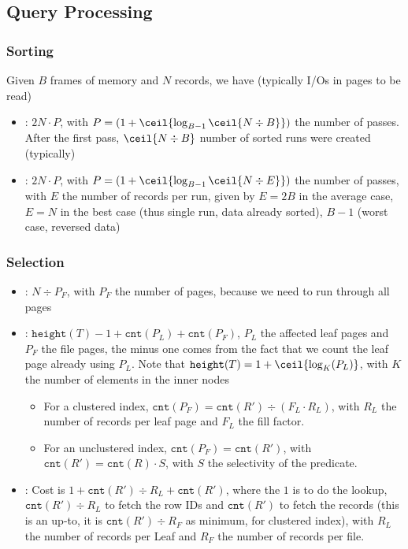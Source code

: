 \newpage
\subsection{Query Processing}
\subsubsection{Sorting}
Given $B$ frames of memory and $N$ records, we have (typically I/Os in pages to be read)
\begin{itemize}
    \item {}: $2N \cdot P$, with $P = (1 + \ceil{\log_{B - 1}\ceil{N \div B}})$ the number of passes.
          After the first pass, $\ceil{N \div B}$ number of sorted runs were created (typically)
    \item {}: $2N \cdot P$, with $P = (1 + \ceil{\log_{B - 1} \ceil{N \div E}})$ the number of passes, with $E$ the number of records per run,
          given by $E = 2B$ in the average case, $E = N$ in the best case (thus single run, data already sorted), $B - 1$ (worst case, reversed data)
\end{itemize}


\subsubsection{Selection}
\begin{itemize}
    \item {}: $N \div P_F$, with $P_F$ the number of pages, because we need to run through all pages
    \item {}: $\texttt{height}(T) - 1 + \texttt{cnt}(P_L) + \texttt{cnt}(P_F)$, $P_L$ the affected leaf pages and $P_F$ the file pages,
          the minus one comes from the fact that we count the leaf page already using $P_L$.
          Note that $\texttt{height}(T) = 1 + \ceil{\log_K(P_L)}$, with $K$ the number of elements in the inner nodes
          \begin{itemize}
              \item For a clustered index, $\texttt{cnt}(P_F) = \texttt{cnt}(R') \div (F_L \cdot R_L)$, with $R_L$ the number of records per leaf page and $F_L$ the fill factor.
              \item For an unclustered index, $\texttt{cnt}(P_F) = \texttt{cnt}(R')$, with $\texttt{cnt}(R') = \texttt{cnt}(R) \cdot S$, with $S$ the selectivity of the predicate.
          \end{itemize}
    \item {}: Cost is $1 + \texttt{cnt}(R') \div R_L + \texttt{cnt}(R')$, where the $1$ is to do the lookup,
          $\texttt{cnt}(R') \div R_L$ to fetch the row IDs and $\texttt{cnt}(R')$ to fetch the records
          (this is an up-to, it is $\texttt{cnt}(R') \div R_F$ as minimum, for clustered index), with $R_L$ the number of records per Leaf and $R_F$ the number of records per file.
\end{itemize}


